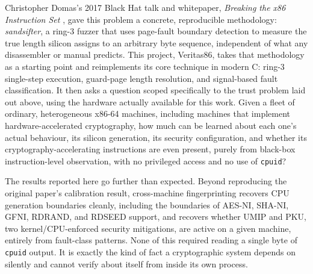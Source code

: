 \documentclass[11pt]{article}
\newcommand{\code}[1]{\texttt{#1}}
\newcommand{\project}{Veritas86}
\begin{document}
Christopher Domas's 2017 Black Hat talk and whitepaper, \emph{Breaking
the x86 Instruction Set} \cite{domas2017}, gave this problem a concrete,
reproducible methodology: \emph{sandsifter}, a ring-3 fuzzer that uses
page-fault boundary detection to measure the true length silicon assigns
to an arbitrary byte sequence, independent of what any disassembler or
manual predicts. This project, \project{}, takes that methodology as a
starting point and reimplements its core technique in modern C: ring-3
single-step execution, guard-page length resolution, and signal-based
fault classification. It then asks a question scoped specifically to the
trust problem laid out above, using the hardware actually available for
this work. Given a fleet of ordinary, heterogeneous x86-64 machines,
including machines that implement hardware-accelerated cryptography, how
much can be learned about each one's actual behaviour, its silicon
generation, its security configuration, and whether its
cryptography-accelerating instructions are even present, purely from
black-box instruction-level observation, with no privileged access and
no use of \code{cpuid}?

The results reported here go further than expected. Beyond reproducing
the original paper's calibration result, cross-machine fingerprinting
recovers CPU generation boundaries cleanly, including the boundaries of
AES-NI, SHA-NI, GFNI, RDRAND, and RDSEED support, and recovers whether
UMIP and PKU, two kernel/CPU-enforced security mitigations, are active on
a given machine, entirely from fault-class patterns. None of this
required reading a single byte of \code{cpuid} output. It is exactly the
kind of fact a cryptographic system depends on silently and cannot verify
about itself from inside its own process.
\end{document}
